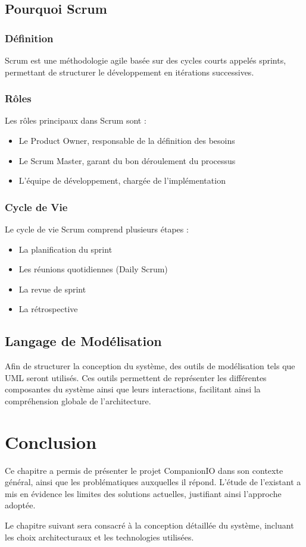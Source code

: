 \subsection{Pourquoi Scrum}

\subsubsection{Définition}

Scrum est une méthodologie agile basée sur des cycles courts appelés sprints, permettant de structurer le développement en itérations successives.

\subsubsection{Rôles}

Les rôles principaux dans Scrum sont :
\begin{itemize}
    \item Le Product Owner, responsable de la définition des besoins
    \item Le Scrum Master, garant du bon déroulement du processus
    \item L’équipe de développement, chargée de l’implémentation
\end{itemize}

\subsubsection{Cycle de Vie}

Le cycle de vie Scrum comprend plusieurs étapes :
\begin{itemize}
    \item La planification du sprint
    \item Les réunions quotidiennes (Daily Scrum)
    \item La revue de sprint
    \item La rétrospective
\end{itemize}

\subsection{Langage de Modélisation}

Afin de structurer la conception du système, des outils de modélisation tels que UML seront utilisés. Ces outils permettent de représenter les différentes composantes du système ainsi que leurs interactions, facilitant ainsi la compréhension globale de l’architecture.

\section{Conclusion}

Ce chapitre a permis de présenter le projet CompanionIO dans son contexte général, ainsi que les problématiques auxquelles il répond. L’étude de l’existant a mis en évidence les limites des solutions actuelles, justifiant ainsi l’approche adoptée.

Le chapitre suivant sera consacré à la conception détaillée du système, incluant les choix architecturaux et les technologies utilisées.